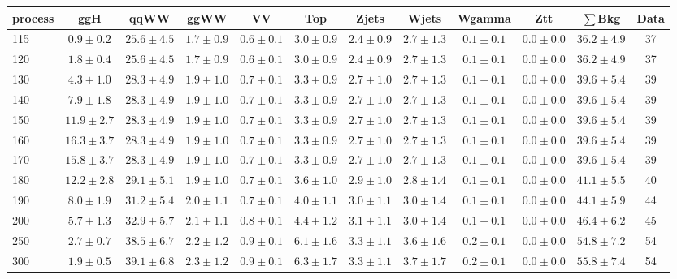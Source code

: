 \begin{table}
{\footnotesize
 \begin{center}
 \begin{tabular}{l c c c c c c c c c c c }
 \hline
 process & ggH & qqWW & ggWW & VV & Top & Zjets & Wjets & Wgamma & Ztt & $\sum$Bkg & Data \\
 \hline
115 & $0.9\pm0.2$ & $25.6\pm4.5$ & $1.7\pm0.9$ & $0.6\pm0.1$ & $3.0\pm0.9$ & $2.4\pm0.9$ & $2.7\pm1.3$ & $0.1\pm0.1$ & $0.0\pm0.0$ & $36.2\pm4.9$ & 37 \\
120 & $1.8\pm0.4$ & $25.6\pm4.5$ & $1.7\pm0.9$ & $0.6\pm0.1$ & $3.0\pm0.9$ & $2.4\pm0.9$ & $2.7\pm1.3$ & $0.1\pm0.1$ & $0.0\pm0.0$ & $36.2\pm4.9$ & 37 \\
130 & $4.3\pm1.0$ & $28.3\pm4.9$ & $1.9\pm1.0$ & $0.7\pm0.1$ & $3.3\pm0.9$ & $2.7\pm1.0$ & $2.7\pm1.3$ & $0.1\pm0.1$ & $0.0\pm0.0$ & $39.6\pm5.4$ & 39 \\
140 & $7.9\pm1.8$ & $28.3\pm4.9$ & $1.9\pm1.0$ & $0.7\pm0.1$ & $3.3\pm0.9$ & $2.7\pm1.0$ & $2.7\pm1.3$ & $0.1\pm0.1$ & $0.0\pm0.0$ & $39.6\pm5.4$ & 39 \\
150 & $11.9\pm2.7$ & $28.3\pm4.9$ & $1.9\pm1.0$ & $0.7\pm0.1$ & $3.3\pm0.9$ & $2.7\pm1.0$ & $2.7\pm1.3$ & $0.1\pm0.1$ & $0.0\pm0.0$ & $39.6\pm5.4$ & 39 \\
160 & $16.3\pm3.7$ & $28.3\pm4.9$ & $1.9\pm1.0$ & $0.7\pm0.1$ & $3.3\pm0.9$ & $2.7\pm1.0$ & $2.7\pm1.3$ & $0.1\pm0.1$ & $0.0\pm0.0$ & $39.6\pm5.4$ & 39 \\
170 & $15.8\pm3.7$ & $28.3\pm4.9$ & $1.9\pm1.0$ & $0.7\pm0.1$ & $3.3\pm0.9$ & $2.7\pm1.0$ & $2.7\pm1.3$ & $0.1\pm0.1$ & $0.0\pm0.0$ & $39.6\pm5.4$ & 39 \\
180 & $12.2\pm2.8$ & $29.1\pm5.1$ & $1.9\pm1.0$ & $0.7\pm0.1$ & $3.6\pm1.0$ & $2.9\pm1.0$ & $2.8\pm1.4$ & $0.1\pm0.1$ & $0.0\pm0.0$ & $41.1\pm5.5$ & 40 \\
190 & $8.0\pm1.9$ & $31.2\pm5.4$ & $2.0\pm1.1$ & $0.7\pm0.1$ & $4.0\pm1.1$ & $3.0\pm1.1$ & $3.0\pm1.4$ & $0.1\pm0.1$ & $0.0\pm0.0$ & $44.1\pm5.9$ & 44 \\
200 & $5.7\pm1.3$ & $32.9\pm5.7$ & $2.1\pm1.1$ & $0.8\pm0.1$ & $4.4\pm1.2$ & $3.1\pm1.1$ & $3.0\pm1.4$ & $0.1\pm0.1$ & $0.0\pm0.0$ & $46.4\pm6.2$ & 45 \\
250 & $2.7\pm0.7$ & $38.5\pm6.7$ & $2.2\pm1.2$ & $0.9\pm0.1$ & $6.1\pm1.6$ & $3.3\pm1.1$ & $3.6\pm1.6$ & $0.2\pm0.1$ & $0.0\pm0.0$ & $54.8\pm7.2$ & 54 \\
300 & $1.9\pm0.5$ & $39.1\pm6.8$ & $2.3\pm1.2$ & $0.9\pm0.1$ & $6.3\pm1.7$ & $3.3\pm1.1$ & $3.7\pm1.7$ & $0.2\pm0.1$ & $0.0\pm0.0$ & $55.8\pm7.4$ & 54 \\

\end{tabular}
\end{center}}
\end{table}
